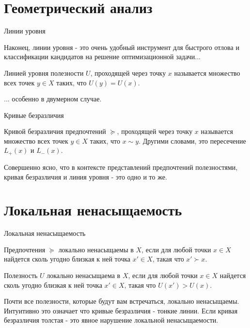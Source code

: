 \documentclass{beamer}
\begin{document}
\section{Геометрический анализ}

\begin{frame}{Линии уровня}

Наконец, линии уровня - это очень удобный инструмент для быстрого отлова и классификации кандидатов на решение оптимизационной задачи...

\begin{definition}
\alert{Линией уровня} полезности $U$, проходящей через точку $x$ называется множество всех точек $y \in X$ таких, что $U(y) = U(x)$.
\end{definition}

... особенно в двумерном случае.

\end{frame}

\begin{frame}{Кривые безразличия}

\begin{definition}
\alert{Кривой безразличия} предпочтений $\succcurlyeq$, проходящей через точку $x$ называется множество всех точек $y \in X$ таких, что $x \sim y$. Другими словами, это пересечение $L_+(x)$ и $L_-(x)$.
\end{definition}

Совершенно ясно, что в контексте представлений предпочтений полезностями, кривая безразличия и линия уровня - это одно и то же.

\end{frame}

\section{Локальная ненасыщаемость}

\begin{frame}{Локальная ненасыщаемость}

\begin{definition}
Предпочтения $\succcurlyeq$ \alert{локально ненасыщаемы} в $X$, если для любой точки $x \in X$ найдется сколь угодно близкая к ней точка $x' \in X$, такая что $x' \succ x$.
\end{definition}

\begin{definition}
Полезность $U$ \alert{локально ненасыщаема} в $X$, если для любой точки $x \in X$ найдется сколь угодно близкая к ней точка $x' \in X$, такая что $U(x') > U(x)$.
\end{definition}

Почти все полезности, которые будут вам встречаться, локально ненасыщаемы. Интуитивно это означает что кривые безразличия - тонкие линии. Если кривая безразличия толстая - это явное нарушение локальной ненасыщаемости.

\end{frame}
\end{document}
